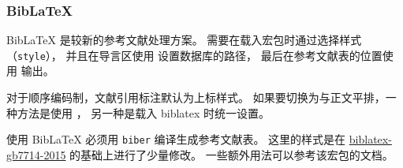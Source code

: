 \documentclass[a4paper]{ltxdoc}
\DeclareRobustCommand\file{\nolinkurl}
\DeclareRobustCommand\pkg{\textsf}
\DeclareRobustCommand\opt{\texttt}
\begin{document}
\subsubsection{BibLaTeX}

BibLaTeX 是较新的参考文献处理方案。
需要在载入宏包时通过选择样式（\opt{style}），
并且在导言区使用  设置数据库的路径，
最后在参考文献表的位置使用  输出。

对于顺序编码制，文献引用标注默认为上标样式。
如果要切换为与正文平排，一种方法是使用 ，
另一种是载入 \pkg{biblatex} 时统一设置。
\begin{latex}
  \usepackage[bibstyle=hfutthesis-numeric,
  citestyle=hfutthesis-inline]{biblatex}
\end{latex}

使用 BibLaTeX 必须用 \file{biber} 编译生成参考文献表。
这里的样式是在 \href{https://ctan.org/pkg/biblatex-gb7714-2015}{biblatex-gb7714-2015}
的基础上进行了少量修改。
一些额外用法可以参考该宏包的文档。
\end{document}
